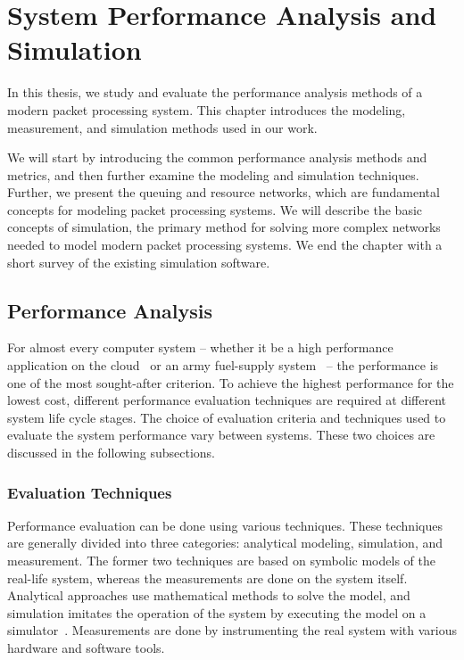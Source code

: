\chapter{System Performance Analysis and Simulation}
\label{chapter:system-performance-analysis-and-simulation}
In this thesis, we study and evaluate the performance analysis methods of a modern packet processing system. This chapter introduces the modeling, measurement, and simulation methods used in our work.

We will start by introducing the common performance analysis methods and metrics, and then further examine the modeling and simulation techniques. Further, we present the queuing and resource networks, which are fundamental concepts for modeling packet processing systems. We will describe the basic concepts of simulation, the primary method for solving more complex networks needed to model modern packet processing systems. We end the chapter with a short survey of the existing simulation software.


\section{Performance Analysis}
For almost every computer system -- whether it be a high performance application on the cloud~\cite{jackson:2010:HPCOC} or an army fuel-supply system~\cite{sabuncuoglu:2005:TAS} -- the performance is one of the most sought-after criterion. To achieve the highest performance for the lowest cost, different performance evaluation techniques are required at different system life cycle stages. The choice of evaluation criteria and techniques used to evaluate the system performance vary between systems. These two choices are discussed in the following subsections.~\cite{jain:1991:AOCSPA}

\subsection{Evaluation Techniques}
Performance evaluation can be done using various techniques. These techniques are generally divided into three categories: analytical modeling, simulation, and measurement. The former two techniques are based on symbolic models of the real-life system, whereas the measurements are done on the system itself. Analytical approaches use mathematical methods to solve the model, and simulation imitates the operation of the system by executing the model on a simulator~\cite{Banks:2010:DES}. Measurements are done by instrumenting the real system with various hardware and software tools.~\cite{jain:1991:AOCSPA}


